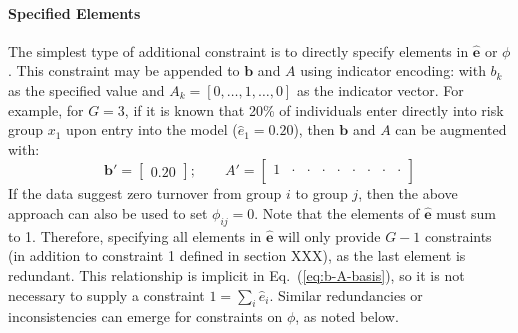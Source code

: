 \paragraph{Specified Elements}
The simplest type of additional constraint is to
directly specify elements in $\bm{\hat{e}}$ or $\phi$.								%
This constraint may be appended to $\bm{b}$ and $A$ using indicator encoding:		%
with $b_k$ as the specified value and $A_k = [0,\dots,1,\dots,0]$ as the indicator vector.	%
For example, for $G = 3$, if it is known that 20\% of individuals
enter directly into risk group $x_1$ upon entry into the model ($\hat{e}_1 = 0.20$),
then $\bm{b}$ and $A$ can be augmented with:
\begin{equation}
\bm{b}' = \left[\begin{array}{c} 0.20 \end{array}\right];\qquad
A' = \left[\begin{array}{ccccccccc}
1 & \cdot & \cdot & \cdot & \cdot & \cdot & \cdot & \cdot & \cdot \\
\end{array}\right] 
\end{equation}																%
If the data suggest zero turnover from group $i$ to group $j$,
then the above approach can also be used to set $\phi_{ij} = 0$.						%
Note that the elements of $\bm{\hat{e}}$ must sum to 1.
Therefore, specifying all elements in $\bm{\hat{e}}$
will only provide $G-1$ constraints (in addition to constraint 1 defined in section XXX),		%
as the last element is redundant.												%
This relationship is implicit in Eq.~(\ref{eq:b-A-basis}),								%
so it is not necessary to supply a constraint $1 = \sum_{i} \hat{e}_i$.						%
Similar redundancies or inconsistencies can emerge for constraints on $\phi$, as noted below.	%
